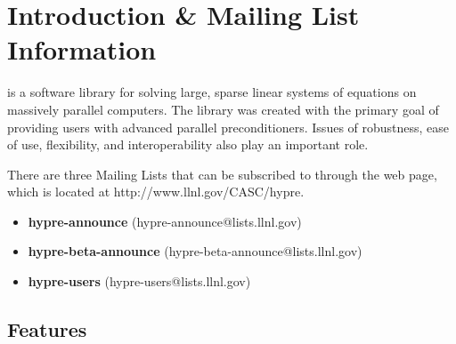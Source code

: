 

\chapter{Introduction & Mailing List Information}
\label{Introduction & Mailing List Information}

\hypre{} is a software library for solving large, sparse linear
systems of equations on massively parallel computers.  The library was
created with the primary goal of providing users with advanced
parallel preconditioners.  Issues of robustness, ease of use,
flexibility, and interoperability also play an important role.


There are three \hypre{} Mailing Lists that can be subscribed to through the \hypre{}
web page, which is located at http://www.llnl.gov/CASC/hypre.  

\begin{itemize}
\item
{\bf hypre-announce} (hypre-announce@lists.llnl.gov)
\linebreak{ }

\item
{\bf hypre-beta-announce} (hypre-beta-announce@lists.llnl.gov)
\linebreak{ }

\item
{\bf hypre-users} (hypre-users@lists.llnl.gov)

\end{itemize}

\section{Features}
\label{Features}

